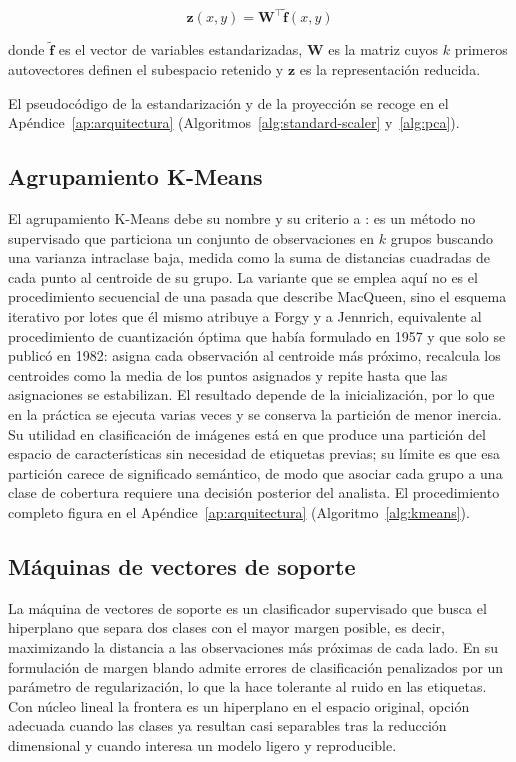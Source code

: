 \begin{equation}
\mathbf{z}(x,y) = \mathbf{W}^{\top} \tilde{\mathbf{f}}(x,y)
\label{eq:pca_formula}
\end{equation}

donde $\tilde{\mathbf{f}}$ es el vector de variables estandarizadas, $\mathbf{W}$ es la matriz cuyos $k$ primeros autovectores definen el subespacio retenido y $\mathbf{z}$ es la representación reducida.

El pseudocódigo de la estandarización y de la proyección se recoge en el Apéndice~\ref{ap:arquitectura} (Algoritmos~\ref{alg:standard-scaler} y~\ref{alg:pca}).

\subsection{Agrupamiento K-Means}

El agrupamiento K-Means debe su nombre y su criterio a \textcite{MacQueen1967}: es un método no supervisado que particiona un conjunto de observaciones en $k$ grupos buscando una varianza intraclase baja, medida como la suma de distancias cuadradas de cada punto al centroide de su grupo. La variante que se emplea aquí no es el procedimiento secuencial de una pasada que describe MacQueen, sino el esquema iterativo por lotes que él mismo atribuye a Forgy y a Jennrich, equivalente al procedimiento de cuantización óptima que \textcite{Lloyd1982} había formulado en 1957 y que solo se publicó en 1982: asigna cada observación al centroide más próximo, recalcula los centroides como la media de los puntos asignados y repite hasta que las asignaciones se estabilizan. El resultado depende de la inicialización, por lo que en la práctica se ejecuta varias veces y se conserva la partición de menor inercia. Su utilidad en clasificación de imágenes está en que produce una partición del espacio de características sin necesidad de etiquetas previas; su límite es que esa partición carece de significado semántico, de modo que asociar cada grupo a una clase de cobertura requiere una decisión posterior del analista. El procedimiento completo figura en el Apéndice~\ref{ap:arquitectura} (Algoritmo~\ref{alg:kmeans}).

\subsection{Máquinas de vectores de soporte}

La máquina de vectores de soporte \parencite{CortesVapnik1995} es un clasificador supervisado que busca el hiperplano
que separa dos clases con el mayor margen posible, es decir, maximizando la distancia a las
observaciones más próximas de cada lado. En su formulación de margen blando admite errores
de clasificación penalizados por un parámetro de regularización, lo que la hace tolerante al
ruido en las etiquetas. Con núcleo lineal la frontera es un hiperplano en el espacio original,
opción adecuada cuando las clases ya resultan casi separables tras la reducción dimensional y
cuando interesa un modelo ligero y reproducible.

